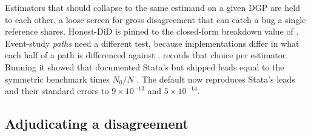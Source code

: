 Estimators that should collapse to the same estimand on a given DGP are
held to each other, a loose screen for gross disagreement that can catch a
bug a single reference shares. Honest-DiD is pinned to the closed-form
breakdown value of \citet{rambachan2023more}. Event-study \emph{paths} need a
different test, because implementations differ in what each half of a path
is differenced against \citep{roth2026interpreting}.
 records that choice per estimator.
Running it showed that  documented Stata's
 but shipped leads equal to the symmetric benchmark times
\(N_0/N\) \citep{li2025benchmarking}. The default now reproduces Stata's
leads and their standard errors to \(9\times10^{-13}\) and
\(5\times10^{-14}\).

\subsection{Adjudicating a disagreement}\label{sec:adjudication}

